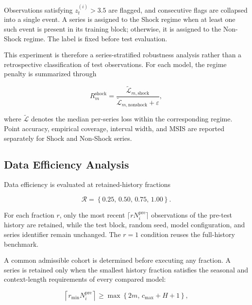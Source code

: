 \documentclass[review,number,sort&compress]{elsarticle}
\begin{document}
Observations satisfying \(z_t^{(i)}>3.5\) are flagged, and consecutive flags are collapsed into a single event. A series is assigned to the Shock regime when at least one such event is present in its training block; otherwise, it is assigned to the Non-Shock regime. The label is fixed before test evaluation.

This experiment is therefore a series-stratified robustness analysis rather than a retrospective classification of test observations. For each model, the regime penalty is summarized through

\begin{equation}
R_m^{\mathrm{shock}}
=
\frac{
\widetilde{\mathcal{L}}_{m,\mathrm{shock}}
}{
\widetilde{\mathcal{L}}_{m,\mathrm{nonshock}}+\varepsilon
},
\label{eq:shock_penalty}
\end{equation}

where \(\widetilde{\mathcal{L}}\) denotes the median per-series loss within the corresponding regime. Point accuracy, empirical coverage, interval width, and MSIS are reported separately for Shock and Non-Shock series.

\subsection{Data Efficiency Analysis}
\label{subsec:data_efficiency}

Data efficiency is evaluated at retained-history fractions

\begin{equation}
\mathcal{R}
=
\left\{
0.25,\,
0.50,\,
0.75,\,
1.00
\right\}.
\end{equation}

For each fraction \(r\), only the most recent \(\lceil rN_i^{\mathrm{pre}}\rceil\) observations of the pre-test history are retained, while the test block, random seed, model configuration, and series identifier remain unchanged. The \(r=1\) condition reuses the full-history benchmark.

A common admissible cohort is determined before executing any fraction. A series is retained only when the smallest history fraction satisfies the seasonal and context-length requirements of every compared model:

\begin{equation}
\left\lceil
r_{\min}N_i^{\mathrm{pre}}
\right\rceil
\geq
\max
\left\{
2m,\,
c_{\max}+H+1
\right\},
\label{eq:data_efficiency_admissibility}
\end{equation}
\end{document}

